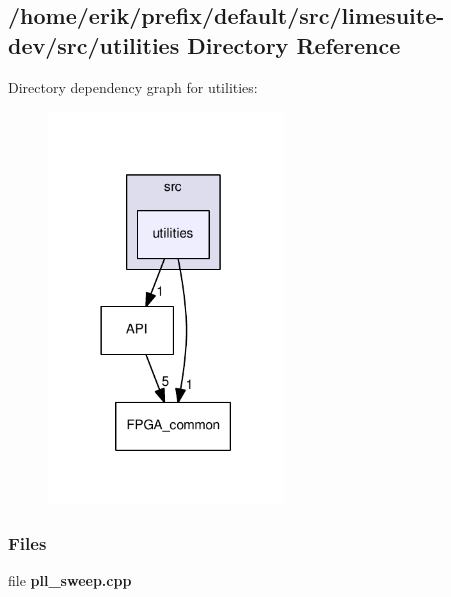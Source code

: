 \subsection{/home/erik/prefix/default/src/limesuite-\/dev/src/utilities Directory Reference}
\label{dir_f5330771e747ddfb97521b09c3be21c5}
Directory dependency graph for utilities\+:
\nopagebreak
\begin{figure}[H]
\begin{center}
\leavevmode
\includegraphics[width=177pt]{dir_f5330771e747ddfb97521b09c3be21c5_dep}
\end{center}
\end{figure}
\subsubsection*{Files}
\begin{DoxyCompactItemize}
\item 
file {\bf pll\+\_\+sweep.\+cpp}
\end{DoxyCompactItemize}

